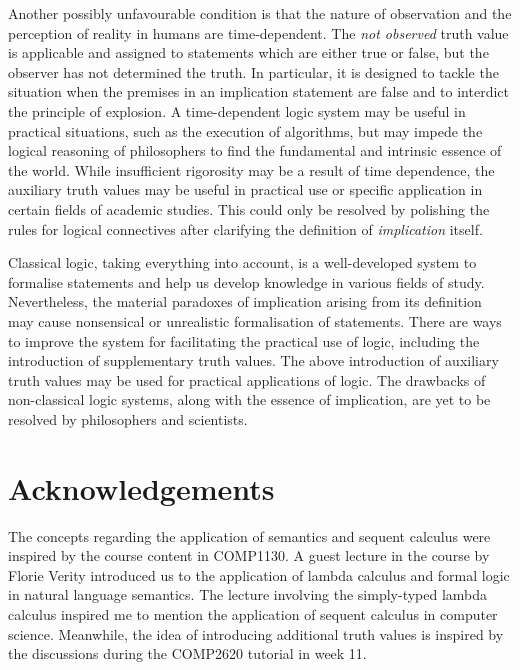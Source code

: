 \documentclass{article}
\begin{document}
Another possibly unfavourable condition is that the nature of observation and
the perception of reality in humans are time-dependent. The
\textit{not observed} truth value is applicable and assigned to statements which
are either true or false, but the observer has not determined the truth. In
particular, it is designed to tackle the situation when the premises in an
implication statement are false and to interdict the principle of explosion.
A time-dependent logic system may be useful in practical situations, such as
the execution of algorithms, but may impede the logical reasoning of
philosophers to find the fundamental and intrinsic essence of the world. While
insufficient rigorosity may be a result of time dependence, the auxiliary truth
values may be useful in practical use or specific application in certain fields
of academic studies. This could only be resolved by polishing the rules for
logical connectives after clarifying the definition of \textit{implication}
itself.

\bigskip

Classical logic, taking everything into account, is a well-developed system to
formalise statements and help us develop knowledge in various fields of study.
Nevertheless, the material paradoxes of implication arising from its definition
may cause nonsensical or unrealistic formalisation of statements. There are ways
to improve the system for facilitating the practical use of logic, including the
introduction of supplementary truth values. The above introduction of auxiliary
truth values may be used for practical applications of logic. The drawbacks of
non-classical logic systems, along with the essence of implication, are yet to
be resolved by philosophers and scientists.

\newpage

\section*{Acknowledgements}

The concepts regarding the application of semantics and sequent calculus were
inspired by the course content in COMP1130. A guest lecture in the course by
Florie Verity introduced us to the application of lambda calculus and formal
logic in natural language semantics. The lecture involving the simply-typed
lambda calculus inspired me to mention the application of sequent calculus in
computer science. Meanwhile, the idea of introducing additional truth values is
inspired by the discussions during the COMP2620 tutorial in week 11.



\end{document}
